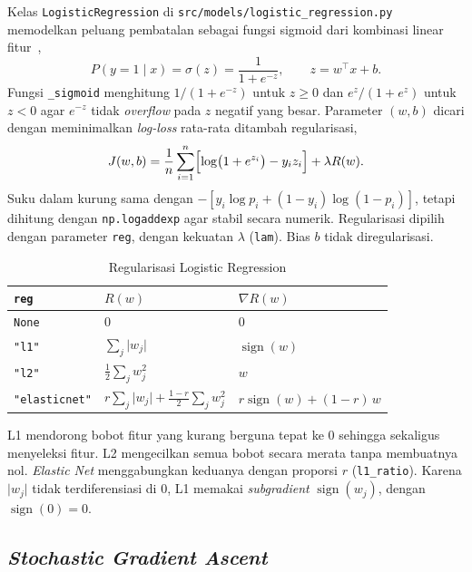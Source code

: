Kelas \texttt{LogisticRegression} di \texttt{src/models/logistic\_regression.py}
memodelkan peluang pembatalan sebagai fungsi sigmoid dari kombinasi linear
fitur~\cite{khodra2021lrwhat},
\begin{equation}
	P(y=1\mid x)=\sigma(z)=\frac{1}{1+e^{-z}},\qquad z=w^\top x+b .
\end{equation}
Fungsi \texttt{\_sigmoid} menghitung $1/(1+e^{-z})$ untuk $z\ge0$ dan
$e^{z}/(1+e^{z})$ untuk $z<0$ agar $e^{-z}$ tidak \textit{overflow} pada $z$
negatif yang besar. Parameter $(w,b)$ dicari dengan meminimalkan
\textit{log-loss} rata-rata ditambah regularisasi,
\begin{equation}
	J(w,b)=\frac{1}{n}\sum_{i=1}^{n}\Bigl[\log\bigl(1+e^{z_i}\bigr)-y_i z_i\Bigr]+\lambda R(w).
\end{equation}
Suku dalam kurung sama dengan $-[y_i\log p_i+(1-y_i)\log(1-p_i)]$, tetapi
dihitung dengan \texttt{np.logaddexp} agar stabil secara numerik. Regularisasi
dipilih dengan parameter \texttt{reg}, dengan kekuatan $\lambda$ (\texttt{lam}).
Bias $b$ tidak diregularisasi.
\begin{table}[H]
	\centering
	\caption{Regularisasi Logistic Regression}
	\label{tab:reg-lr}
	\begin{tabular}{l l l}
		\toprule
		\texttt{reg} & $R(w)$ & $\nabla R(w)$ \\
		\midrule
		\texttt{None} & $0$ & $0$ \\
		\texttt{"l1"} & $\sum_j\lvert w_j\rvert$ & $\operatorname{sign}(w)$ \\
		\texttt{"l2"} & $\tfrac12\sum_j w_j^2$ & $w$ \\
		\texttt{"elasticnet"} & $r\sum_j\lvert w_j\rvert+\tfrac{1-r}{2}\sum_j w_j^2$ & $r\operatorname{sign}(w)+(1-r)\,w$ \\
		\bottomrule
	\end{tabular}
\end{table}
L1 mendorong bobot fitur yang kurang berguna tepat ke 0 sehingga sekaligus
menyeleksi fitur. L2 mengecilkan semua bobot secara merata tanpa membuatnya nol.
\textit{Elastic Net} menggabungkan keduanya dengan proporsi $r$
(\texttt{l1\_ratio}). Karena $\lvert w_j\rvert$ tidak terdiferensiasi di 0,
L1 memakai \textit{subgradient} $\operatorname{sign}(w_j)$, dengan
$\operatorname{sign}(0)=0$.

\subsection{\textit{Stochastic Gradient Ascent}}

